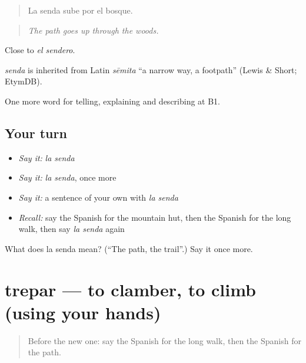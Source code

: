 \begin{quote}
La senda sube por el bosque.
\end{quote}

\begin{quote}
\emph{The path goes up through the woods.}
\end{quote}

Close to \emph{el sendero}.

\begin{cousinweb}
\emph{senda} is inherited from Latin \emph{sēmita} \textquotedblleft{}a narrow way, a footpath\textquotedblright{} (Lewis \& Short; EtymDB).
\end{cousinweb}

\begin{grammarlens}[title={What you've built}]
One more word for telling, explaining and describing at B1.
\end{grammarlens}

\subsection*{Your turn}
\begin{itemize}
\raggedright
  \item \emph{Say it:} \emph{la senda}
  \item \emph{Say it:} \emph{la senda}, once more
  \item \emph{Say it:} a sentence of your own with \emph{la senda}
  \item \emph{Recall:} say the Spanish for the mountain hut, then the Spanish for the long walk, then say \emph{la senda} again
\end{itemize}

\begin{tcolorbox}[breakable,colback=teal!4,colframe=teal!35!black,title={Before you move on}]
What does la senda mean? (\textquotedblleft{}The path, the trail\textquotedblright{}.) Say it once more.
\end{tcolorbox}
\section[trepar]{trepar — to clamber, to climb (using your hands)}

\label{lesson:ES-C687-trepar}



\begin{quote}
Before the new one: say the Spanish for the long walk, then the Spanish for the path.
\end{quote}


